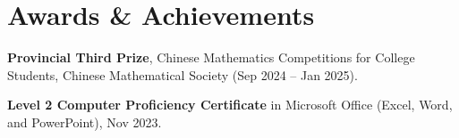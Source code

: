 \documentclass[letterpaper,11pt]{article}
\newcommand{\resumeSubHeadingListStart}{%
  \begin{itemize}[leftmargin=0.15in, label={}]%
}
\newcommand{\resumeSubHeadingListEnd}{\end{itemize}}
\begin{document}
\section{Awards \& Achievements}
  \vspace{2pt}
  \resumeSubHeadingListStart
    \small{\item{

        \textbf{Provincial Third Prize}, Chinese Mathematics Competitions
        for College Students, Chinese Mathematical Society
        (Sep 2024 -- Jan 2025). \\ \vspace{3pt}
    
        
        
        
        \textbf{Level 2 Computer Proficiency Certificate}
        in Microsoft Office (Excel, Word, and PowerPoint), Nov 2023.
    }}
  \resumeSubHeadingListEnd




      
\end{document}
